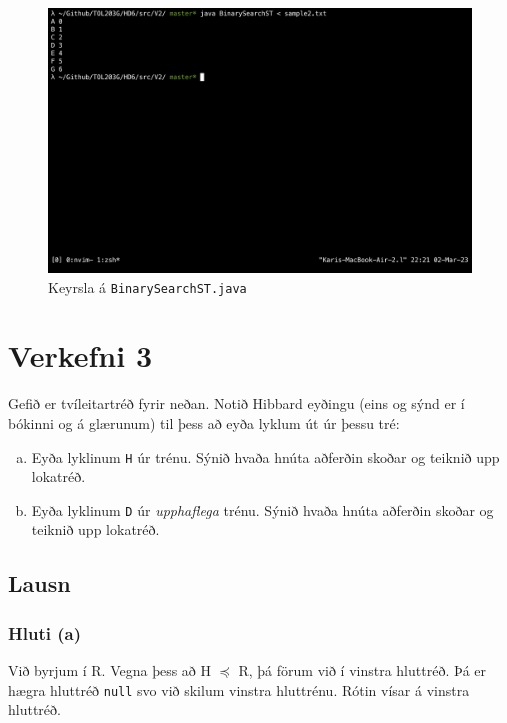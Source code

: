 \documentclass[12pt, a4paper, hidelinks]{article}
\begin{document}
\newpage

\begin{figure}[H]
   \centering
   \includegraphics[width=\textwidth]{img/v2-keyrsla.png} 
   \caption{Keyrsla á \texttt{BinarySearchST.java}}
\end{figure}

\newpage

\section*{Verkefni 3}
Gefið er tvíleitartréð fyrir neðan. Notið Hibbard eyðingu (eins og sýnd er í bókinni og á
glærunum) til þess að eyða lyklum út úr þessu tré:
\begin{enumerate}[(a)]
    \item Eyða lyklinum \texttt{H} úr trénu. Sýnið hvaða hnúta aðferðin
    skoðar og teiknið upp lokatréð.
    \item Eyða lyklinum \texttt{D} úr \emph{upphaflega} trénu. Sýnið hvaða hnúta aðferðin
    skoðar og teiknið upp lokatréð. 
\end{enumerate}

\subsection*{Lausn}
\subsubsection*{Hluti (a)}
Við byrjum í \textsf{R}. Vegna þess að \textsf{H} $\preceq$ \textsf{R}, þá förum við í vinstra
hluttréð. Þá er hægra hluttréð \texttt{null} svo við skilum vinstra hluttrénu.
Rótin vísar á vinstra hluttréð.
\medskip
\end{document}
